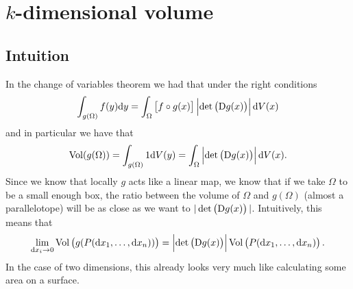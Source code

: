 \documentclass[11pt,a4paper]{article}
\begin{document}
\newpage

\section{\texorpdfstring{$k$}{k}-dimensional volume}

\subsection{Intuition}
In the change of variables theorem we had that under the right
conditions
\[
  \int_{g(\Omega)} f(y) \dy =
  \int_{\Omega} \left[f \circ g(x)\right] \abs{\det\del{\Dif g(x)}} \dV(x)
\]
and in particular we have that
\[
  \Vol(g(\Omega)) =
  \int_{g(\Omega)} 1 \dV(y) =
  \int_{\Omega} \abs{\det\del{\Dif g(x)}} \dV(x).
\]
Since we know that locally $g$ acts like a linear map,
we know that if we take $\Omega$ to be a small enough box,
the ratio between the volume of $\Omega$ and $g(\Omega)$
(almost a parallelotope)
will be as close as we want to $|\det\del{\Dif g(x)}|$.
Intuitively, this means that
\[
  \lim_{\dx_i \to 0}
  \Vol\del{g(P(\dx_1,\dots,\dx_n))} =
  \abs{\det\del{\Dif g(x)}} \Vol\del{P(\dx_1,\dots,\dx_n)}.
\]
In the case of two dimensions,
this already looks very much like calculating some area on a surface.
\end{document}
